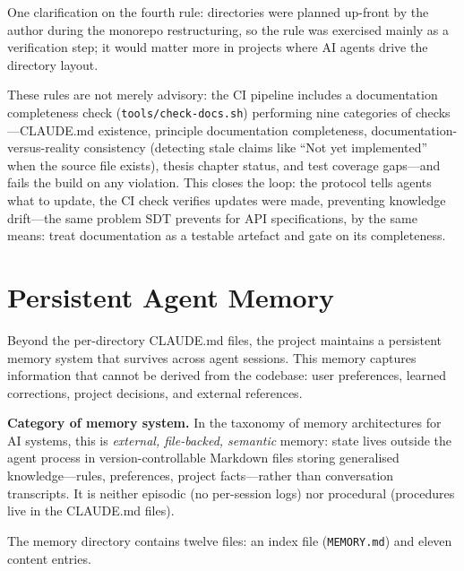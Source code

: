 One clarification on the fourth rule: directories were planned up-front by the author during the monorepo restructuring, so the rule was exercised mainly as a verification step; it would matter more in projects where AI agents drive the directory layout.

These rules are not merely advisory: the CI pipeline includes a documentation completeness check (\texttt{tools/check-docs.sh}) performing nine categories of checks---CLAUDE.md existence, principle documentation completeness, documentation-versus-reality consistency (detecting stale claims like ``Not yet implemented'' when the source file exists), thesis chapter status, and test coverage gaps---and fails the build on any violation. This closes the loop: the protocol tells agents what to update, the CI check verifies updates were made, preventing knowledge drift---the same problem SDT prevents for API specifications, by the same means: treat documentation as a testable artefact and gate on its completeness.

\section{Persistent Agent Memory}
\label{sec:agent-memory}

Beyond the per-directory CLAUDE.md files, the project maintains a persistent memory system that survives across agent sessions. This memory captures information that cannot be derived from the codebase: user preferences, learned corrections, project decisions, and external references.

\textbf{Category of memory system.} In the taxonomy of memory architectures for AI systems, this is \emph{external, file-backed, semantic} memory: state lives outside the agent process in version-controllable Markdown files storing generalised knowledge---rules, preferences, project facts---rather than conversation transcripts. It is neither episodic (no per-session logs) nor procedural (procedures live in the CLAUDE.md files).

The memory directory contains twelve files: an index file (\texttt{MEMORY.md}) and eleven content entries.

